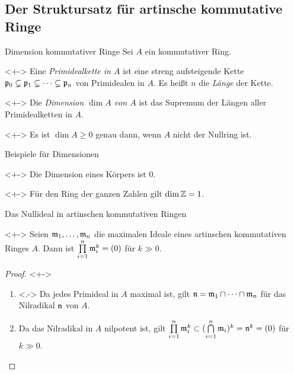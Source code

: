 \subsection{Der Struktursatz für artinsche kommutative Ringe}

\begin{frame}{Dimension kommutativer Ringe}
	Sei \(A\) ein kommutativer Ring.
	\begin{definition}<+->
		Eine \emph{Primidealkette in \(A\)} ist eine streng aufsteigende
		Kette \(\mathfrak{p}_0 \subsetneq \mathfrak{p}_1 \subsetneq \dotsb
		\subsetneq \mathfrak{p}_n\) von Primidealen in \(A\). Es heißt \(n\)
		die \emph{Länge} der Kette.
	\end{definition}
	\begin{definition}<+->
		Die \emph{Dimension \(\dim A\) von \(A\)} ist das Supremum der Längen
		aller Primidealketten in \(A\).
	\end{definition}
	\begin{example}<+->
		Es ist \(\dim A \ge 0\) genau dann, wenn \(A\) nicht der Nullring ist.
	\end{example}
\end{frame}

\begin{frame}{Beispiele für Dimensionen}
	\begin{example}<+->
		Die Dimension eines Körpers ist \(0\).
	\end{example}
	\begin{example}<+->
		Für den Ring der ganzen Zahlen gilt \(\dim \mathbb Z = 1\).
	\end{example}
\end{frame}

\begin{frame}{Das Nullideal in artinschen kommutativen Ringen}
	\begin{lemma}<+->
		\label{lem:zero_is_prod_of_max}
		Seien \(\mathfrak{m}_1, \dotsc, \mathfrak{m}_n\) die maximalen Ideale
		eines artinschen kommutativen Ringes \(A\). Dann ist
		\(\prod\limits_{i = 1}^n \mathfrak{m}_i^k = (0)\) für \(k \gg 0\).
	\end{lemma}
	\begin{proof}<+->
		\begin{enumerate}[<+->]
		\item<.->
			Da jedes Primideal in \(A\) maximal ist, gilt \(\mathfrak{n} = \mathfrak{m}_1
			\cap \dotsb \cap \mathfrak{m}_n\) für das Nilradikal \(\mathfrak{n}\) von
			\(A\).
		\item
			Da das Nilradikal in \(A\) nilpotent ist, gilt
			\(\prod\limits_{i = 1}^n \mathfrak{m}_i^k
			\subset (\bigcap\limits_{i = 1}^n \mathfrak{m}_i)^k = \mathfrak{n}^k = (0)\)
			für \(k \gg 0\).
			\qedhere
		\end{enumerate}
	\end{proof}
\end{frame}

